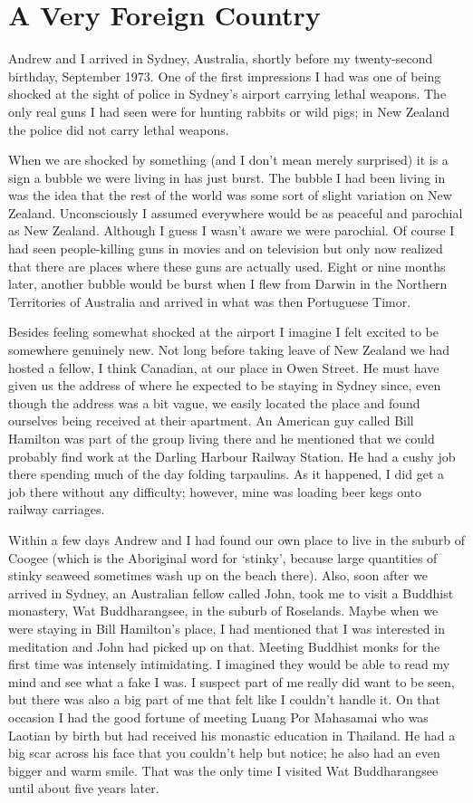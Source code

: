 \chapter{A Very Foreign Country}

Andrew and I arrived in Sydney, Australia, shortly before my twenty-second
birthday, September 1973. One of the first impressions I had was one of
being shocked at the sight of police in Sydney's airport carrying lethal
weapons. The only real guns I had seen were for hunting rabbits or wild
pigs; in New Zealand the police did not carry lethal weapons.

When we are shocked by something (and I don't mean merely surprised) it
is a sign a bubble we were living in has just burst. The bubble I had
been living in was the idea that the rest of the world was some sort of
slight variation on New Zealand. Unconsciously I assumed everywhere
would be as peaceful and parochial as New Zealand. Although I guess I
wasn't aware we were parochial. Of course I had seen people-killing guns
in movies and on television but only now realized that there are places
where these guns are actually used. Eight or nine months later, another
bubble would be burst when I flew from Darwin in the Northern
Territories of Australia and arrived in what was then Portuguese Timor.

Besides feeling somewhat shocked at the airport I imagine I felt excited
to be somewhere genuinely new. Not long before taking leave of New
Zealand we had hosted a fellow, I think Canadian, at our place in Owen
Street. He must have given us the address of where he expected to be
staying in Sydney since, even though the address was a bit vague, we
easily located the place and found ourselves being received at their
apartment. An American guy called Bill Hamilton was part of the group
living there and he mentioned that we could probably find work at the
Darling Harbour Railway Station. He had a cushy job there spending much
of the day folding tarpaulins. As it happened, I did get a job there
without any difficulty; however, mine was loading beer kegs onto railway
carriages.

Within a few days Andrew and I had found our own place to live in the
suburb of Coogee (which is the Aboriginal word for `stinky', because
large quantities of stinky seaweed sometimes wash up on the beach
there). Also, soon after we arrived in Sydney, an Australian fellow
called John, took me to visit a Buddhist monastery, Wat Buddharangsee,
in the suburb of Roselands. Maybe when we were staying in Bill
Hamilton's place, I had mentioned that I was interested in meditation
and John had picked up on that. Meeting Buddhist monks for the first
time was intensely intimidating. I imagined they would be able to read
my mind and see what a fake I was. I suspect part of me really did want to be seen, but there was also a big part of me that felt like I couldn't handle it. On that
occasion I had the good fortune of meeting Luang Por Mahasamai who
was Laotian by birth but had received his monastic education in
Thailand. He had a big scar across his face that you couldn't help but notice; he also had an even bigger and warm smile. That was the only time I visited Wat Buddharangsee until about five years later.

